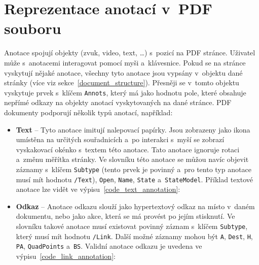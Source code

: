 \section{Reprezentace anotací v~PDF souboru} \label{PDF_annotations}
Anotace spojují objekty (zvuk, video, text, \dots) s~pozicí na PDF stránce.
Uživatel může s~anotacemi interagovat pomocí myši a~klávesnice.
Pokud se na stránce vyskytují nějaké anotace, všechny tyto anotace jsou vypsány
v~objektu dané stránky (více viz sekce~\ref{document_structure}). Přesněji
se v~tomto objektu vyskytuje prvek s~klíčem \texttt{Annots}, který má jako 
hodnotu pole, které obsahuje nepřímé odkazy na objekty anotací vyskytovaných
na dané stránce.
PDF dokumenty podporují několik typů anotací, 
například:
\begin{itemize}
    \item \textbf{Text} -- Tyto anotace imitují nalepovací papírky. Jsou
    zobrazeny jako ikona umístěna na určitých souřadnicích a~po interakci s~myší
    se zobrazí vyskakovací okénko s~textem této anotace. Tato anotace ignoruje
    rotaci a~změnu měřítka stránky. Ve slovníku této anotace se můžou navíc
    objevit záznamy s~klíčem \texttt{Subtype} (tento prvek je povinný a~pro tento
    typ anotace musí mít hodnotu \texttt{/Text}), \texttt{Open}, \texttt{Name},
    \texttt{State} a~\texttt{StateModel}. Příklad textové anotace lze vidět ve
    výpisu~\ref{code_text_annotation}:

    \item \textbf{Odkaz} -- Anotace odkazu slouží jako hypertextový
    odkaz na místo v~daném dokumentu, nebo jako akce, která se má
    provést po jejím stisknutí. Ve slovníku takové anotace musí
    existovat povinný záznam s~klíčem \texttt{Subtype}, který musí mít hodnotu
    \texttt{/Link}. Další možné záznamy mohou být \texttt{A},
    \texttt{Dest}, \texttt{H}, \texttt{PA}, \texttt{QuadPoints}
    a~\texttt{BS}. Validní anotace odkazu je uvedena ve
    výpisu~\ref{code_link_annotation}:
    

\end{itemize}

